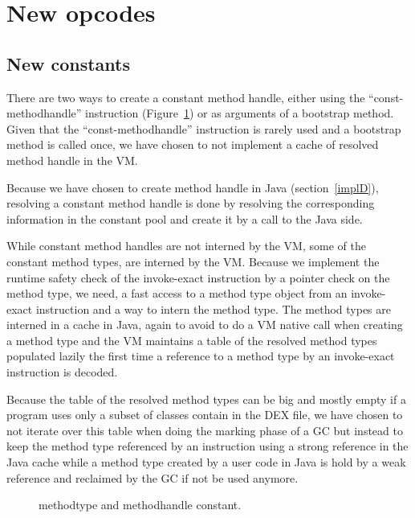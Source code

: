\documentclass{sig-alternate}
\begin{document}
\section{New opcodes}
\label{newConst}
  \subsection{New constants}

    There are two ways to create a constant method handle, either using the ``const-methodhandle''
    instruction (Figure~\ref{MTMHldc}) or as arguments of a bootstrap method.
    Given that the ``const-methodhandle'' instruction is rarely used and
    a bootstrap method is called once, we have chosen to not implement a cache
    of resolved method handle in the VM.

    Because we have chosen to create method handle in Java (section~\ref{implD}),
    resolving a constant method handle is done by resolving the corresponding information
    in the constant pool and create it by a call to the Java side.

    While constant method handles are not interned by the VM, some of the constant method types,
    are interned by the VM. Because we implement the runtime safety check of the invoke-exact
    instruction by a pointer check on the method type, we need, a fast access to a method type object
    from an invoke-exact instruction and a way to intern the method type.
    The method types are interned in a cache in Java, again to avoid to do a VM native call
    when creating a method type and the VM maintains  a table of the resolved method types
    populated lazily the first time a reference to a method type by an invoke-exact instruction
    is decoded.

    Because the table of the resolved method types can be big and mostly empty if a program
    uses only a subset of classes contain in the DEX file, we have chosen to not iterate over this table when doing
    the marking phase of a GC but instead to keep the method type referenced by an instruction
    using a strong reference in the Java cache while a method type created by a user code in Java
    is hold by a weak reference and reclaimed by the GC if not be used anymore.    

    \begin{figure}[!ht]
      \centering \resizebox{1.\linewidth}{!}{}
      \caption{methodtype and methodhandle constant.}\vspace{-1em}
      \label{MTMHldc}
    \end{figure}
\end{document}
